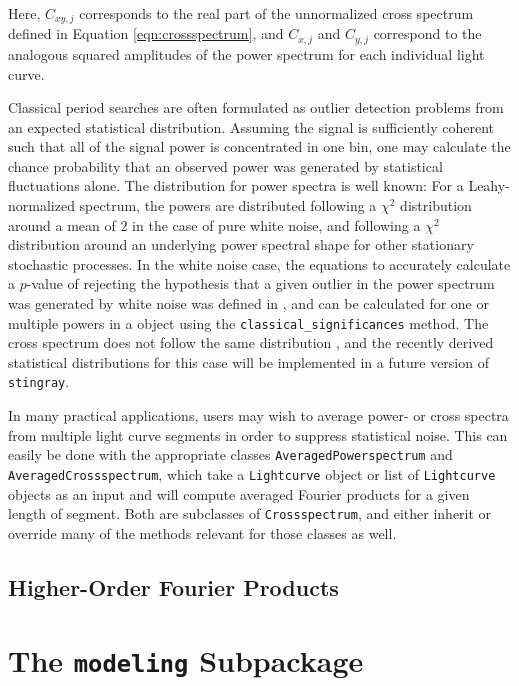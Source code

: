\documentclass[12pt]{emulateapj}
\newcommand{\stingray}{\texttt{stingray}\xspace}
\newcommand{\lightcurve}{\texttt{Lightcurve}\xspace}
\newcommand{\crossspectrum}{\texttt{Crossspectrum}\xspace}
\begin{document}
\noindent Here, $C_{xy,j}$ corresponds to the real part of the unnormalized cross spectrum defined in Equation \ref{eqn:crossspectrum}, and $C_{x,j}$ and $C_{y,j}$ correspond to the analogous squared amplitudes of the power spectrum for each individual light curve. 

Classical period searches are often formulated as outlier detection problems from an expected statistical distribution. Assuming the signal is sufficiently coherent such that all of the signal power is concentrated in one bin, one may calculate the chance probability that an observed power was generated by statistical fluctuations alone. The distribution for power spectra is well known: For a Leahy-normalized spectrum, the powers are distributed following a $\chi^2$ distribution around a mean of $2$ in the case of pure white noise, and following a $\chi^2$ distribution around an underlying power spectral shape for other stationary stochastic processes. In the white noise case, the equations to accurately calculate a $p$-value of rejecting the hypothesis that a given outlier in the power spectrum was generated by white noise was defined in \citep{Groth1975}, and can be calculated for one or multiple powers in a \Powerspectrum object using the \verb|classical_significances| method. The cross spectrum does not follow the same distribution \citep{huppenkothen2018}, and the recently derived statistical distributions for this case will be implemented in a future version of \stingray. 

In many practical applications, users may wish to average power- or cross spectra from multiple light curve segments in order to suppress statistical noise. This can easily be done with the appropriate classes \texttt{AveragedPowerspectrum} and \texttt{AveragedCrossspectrum}, which take a \lightcurve object or list of \lightcurve objects as an input and will compute averaged Fourier products for a given length of segment. Both are subclasses of \crossspectrum, and either inherit or override many of the methods relevant for those classes as well. 



\subsection{Higher-Order Fourier Products}
\label{sec:fourier_others}

\section{The \texttt{modeling} Subpackage}
\label{sec:modeling}
\end{document}
